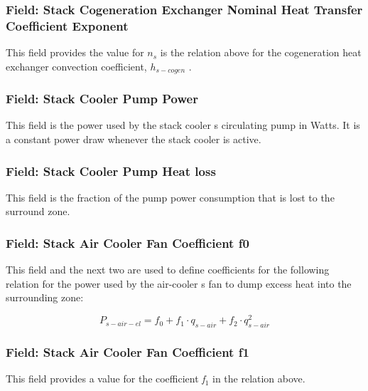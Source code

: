 \subsubsection{Field: Stack Cogeneration Exchanger Nominal Heat Transfer Coefficient Exponent}\label{field-stack-cogeneration-exchanger-nominal-heat-transfer-coefficient-exponent}

This field provides the value for \({n_s}\) is the relation above for the cogeneration heat exchanger convection coefficient, \({h_{s - cogen}}\) .

\subsubsection{Field: Stack Cooler Pump Power}\label{field-stack-cooler-pump-power}

This field is the power used by the stack cooler s circulating pump in Watts. It is a constant power draw whenever the stack cooler is active.

\subsubsection{Field: Stack Cooler Pump Heat loss}\label{field-stack-cooler-pump-heat-loss}

This field is the fraction of the pump power consumption that is lost to the surround zone.

\subsubsection{Field: Stack Air Cooler Fan Coefficient f0}\label{field-stack-air-cooler-fan-coefficient-f0}

This field and the next two are used to define coefficients for the following relation for the power used by the air-cooler s fan to dump excess heat into the surrounding zone:

\begin{equation}
{P_{s - air - el}} = {f_0} + {f_1} \cdot {q_{s - air}} + {f_2} \cdot q_{s - air}^2
\end{equation}

\subsubsection{Field: Stack Air Cooler Fan Coefficient f1}\label{field-stack-air-cooler-fan-coefficient-f1}

This field provides a value for the coefficient \emph{f\(_{1}\)} in the relation above.

